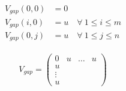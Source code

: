 \documentclass[a4paper]{article}
\begin{document}
\begin{figure}[H]
    \centering
    \begin{minipage}{0.35\textwidth}
        \centering
        \begin{align*}
            V_{gap}(0,0) &= 0 \\
            V_{gap}(i,0) &= u \quad \forall\ 1 \leq i \leq m \\
            V_{gap}(0,j) &= u \quad \forall\ 1 \leq j \leq n
        \end{align*}
    \end{minipage}
    \begin{minipage}{0.35\textwidth}
        \centering
        \begin{align*}
            V_{gap} = \begin{pmatrix}
                            0 & u & \hdots & u \\
                            u \\
                            \vdots \\
                            u
                      \end{pmatrix}
        \end{align*}
    \end{minipage}
\end{figure}
\end{document}
